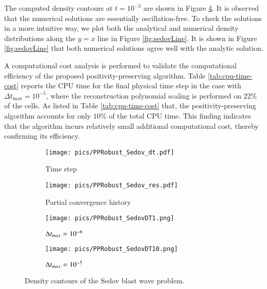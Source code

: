 The computed density contours at $t=10^{-3}$ are shown in Figure \ref{fig:sedov}. It is observed that the numerical solutions are essentially oscillation-free. To check the solutions in a more intuitive way, we plot both the analytical and numerical density distributions along the $y=x$ line in Figure \ref{fig:sedovLine}.
It is shown in Figure \ref{fig:sedovLine} that both numerical solutions agree well with the analytic solution.

A computational cost analysis is performed to validate the computational efficiency of the proposed positivity-preserving algorithm. Table \ref{tab:cpu-time-cost} reports the CPU time for the final physical time step in the case with $\Delta t_{\text{max}} = 10^{-5}$, where the reconstruction polynomial scaling is performed on $22\%$ of the cells. As listed in Table \ref{tab:cpu-time-cost} that, the positivity-preserving algorithm accounts for only $10\%$ of the total CPU time.
This finding indicates that the algorithm incurs relatively small additional computational cost, thereby confirming its efficiency.

\begin{figure}[htbp]
    \centering
    \begin{subfigure}{0.49\textwidth}
        \texttt{[image: pics/PPRobust\_Sedov\_dt.pdf]}
        \caption[]{Time step}
        \label{sfig:sedov1_dt}
    \end{subfigure}
    \hfill
    \begin{subfigure}{0.49\textwidth}
        \texttt{[image: pics/PPRobust\_Sedov\_res.pdf]}
        \caption[]{Partial convergence history}
        \label{sfig:sedov1_res}
    \end{subfigure}
    \caption{}
    \label{fig:sedov1}
\end{figure}

\begin{figure}[htbp]
    \centering
    \begin{subfigure}{0.5\textwidth}
        \texttt{[image: pics/PPRobust\_SedovDT1.png]}
        \caption[]{$\mathrm\Delta t_{max}=10^{-6}$}
    \end{subfigure}\hfill
    \begin{subfigure}{0.5\textwidth}
        \texttt{[image: pics/PPRobust\_SedovDT10.png]}
        \caption[]{$\mathrm\Delta t_{max}=10^{-5}$}
    \end{subfigure}
    \caption{Density contours of the Sedov blast wave problem.}
    \label{fig:sedov}
\end{figure}

